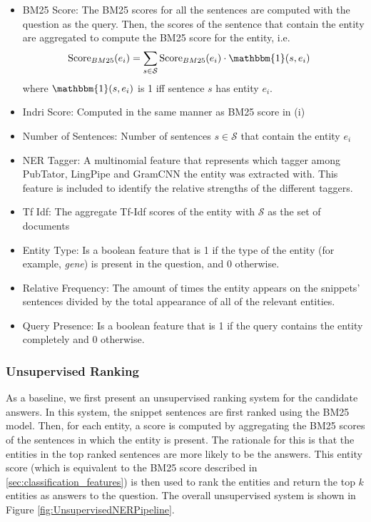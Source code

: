 \documentclass[11pt,a4paper]{article}
\begin{document}
\begin{itemize}[noitemsep]
    \item BM25 Score: The BM25 scores for all the sentences are computed with the question as the query. Then, the scores of the sentence that contain the entity are aggregated to compute the BM25 score for the entity, i.e.
    \begin{align*}
        \text{Score}_{BM25}(e_i) &= \sum_{s \in \mathcal{S}} \text{Score}_{BM25}(e_i) \cdot \mathbbm{1}(s, e_i)
    \end{align*}
    where $\mathbbm{1}(s, e_i)$ is 1 iff sentence $s$ has entity $e_i$.
    \item Indri Score: Computed in the same manner as BM25 score in (i)
    \item Number of Sentences: Number of sentences $s \in \mathcal{S}$ that contain the entity $e_i$
    \item NER Tagger: A multinomial feature that represents which tagger among PubTator, LingPipe and GramCNN the entity was extracted with. This feature is included to identify the relative strengths of the different taggers.
    \item Tf Idf: The aggregate Tf-Idf scores of the entity with $\mathcal{S}$ as the set of documents
    \item Entity Type: Is a boolean feature that is 1 if the type of the entity (for example, \textit{gene}) is present in the question, and 0 otherwise.
    \item Relative Frequency: The amount of times the entity appears on the snippets' sentences divided by the total appearance of all of the relevant entities.
    \item Query Presence: Is a boolean feature that is 1 if the query contains the entity completely and 0 otherwise.

\end{itemize}

\subsubsection{Unsupervised Ranking}

As a baseline, we first present an unsupervised ranking system for the candidate answers. In this system, the snippet sentences are first ranked using the BM25 model. Then, for each entity, a score is computed by aggregating the BM25 scores of the sentences in which the entity is present. The rationale for this is that the entities in the top ranked sentences are more likely to be the answers. This entity score (which is equivalent to the BM25 score described in \ref{sec:classification_features}) is then used to rank the entities and return the top $k$ entities as answers to the question. The overall unsupervised system is shown in Figure \ref{fig:UnsupervisedNERPipeline}.
\end{document}
